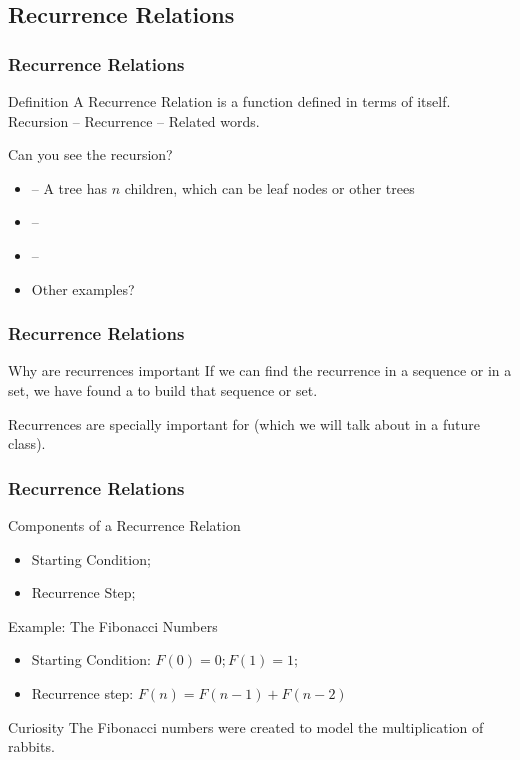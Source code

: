 \documentclass{beamer}
\begin{document}
\subsection{Recurrence Relations}
\begin{frame}
  \frametitle{Recurrence Relations}
  \begin{block}{Definition}
    A Recurrence Relation is a function defined in terms of itself.
    \vspace{0.5cm}
    Recursion -- Recurrence -- Related words.
  \end{block}
  \begin{block}{Can you see the recursion?}
    {\small
    \begin{itemize}
      \item {} -- A tree has $n$ children, which can be leaf nodes or other trees
      \item {} -- 
      \item {} -- 
      \item Other examples?
    \end{itemize}
    }
  \end{block}
\end{frame}

\begin{frame}
  \frametitle{Recurrence Relations}
  \begin{block}{Why are recurrences important}
    If we can find the recurrence in a sequence or in a set, we have
    found a  to build that sequence or
    set.
  \end{block}
  \begin{block}{}
    Recurrences are specially important for  (which we will talk about in a future class).
  \end{block}
\end{frame}

\begin{frame}
  \frametitle{Recurrence Relations}
  {\small
  \begin{block}{Components of a Recurrence Relation}
    \begin{itemize}
    \item Starting Condition;
    \item Recurrence Step;
    \end{itemize}
  \end{block}
  \begin{block}{Example: The Fibonacci Numbers}
    \begin{itemize}
    \item Starting Condition: $F(0) = 0; F(1) = 1;$
    \item Recurrence step: $F(n) = F(n-1) + F(n-2)$
    \end{itemize}
  \end{block}
  \begin{block}{Curiosity}
    The Fibonacci numbers were created to model the multiplication of
    rabbits.
  \end{block}
  }
\end{frame}
\end{document}

